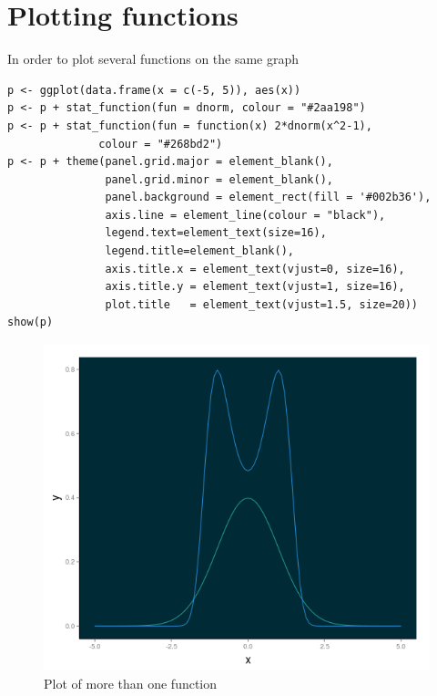 \section{Plotting functions}
In order to plot several functions on
the same graph
\begin{verbatim}
p <- ggplot(data.frame(x = c(-5, 5)), aes(x))  
p <- p + stat_function(fun = dnorm, colour = "#2aa198")
p <- p + stat_function(fun = function(x) 2*dnorm(x^2-1), 
		      colour = "#268bd2")
p <- p + theme(panel.grid.major = element_blank(), 
               panel.grid.minor = element_blank(),
               panel.background = element_rect(fill = '#002b36'),
               axis.line = element_line(colour = "black"),
               legend.text=element_text(size=16),
               legend.title=element_blank(),
               axis.title.x = element_text(vjust=0, size=16),
               axis.title.y = element_text(vjust=1, size=16),
               plot.title   = element_text(vjust=1.5, size=20)) 
show(p)
\end{verbatim}
\begin{figure}[htbp]
 \centering
 \includegraphics[scale = .45]{images/functions}
 \caption*{Plot of more than one function}
\end{figure}

